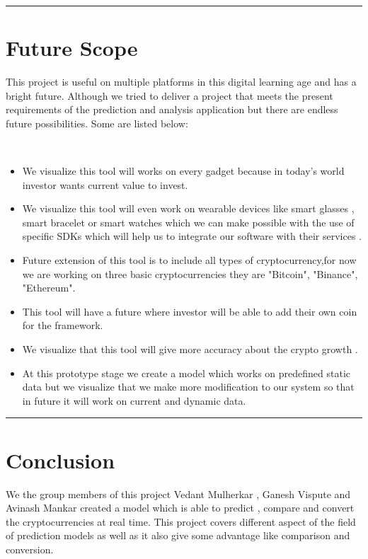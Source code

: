 \documentclass[openany,12pt]{report}
\begin{document}
{{{{{\vfill
\hrule
\chapter{Future Scope}
\hspace{0.5in}This project is useful on multiple platforms in this digital
learning age and has a bright future. Although we tried to deliver a project that meets the present requirements of the prediction and analysis application but there are endless future possibilities. Some are listed below:

\\
\begin{itemize}
\item{We visualize this tool will works on every gadget because in today's world investor wants current value to invest.}
\item{We visualize this tool will even work on wearable devices like smart glasses , smart bracelet or smart watches which we can make possible with the use of specific SDKs which will help us to integrate our software with their services .}
\item{Future extension of this tool is to include all types of cryptocurrency,for now we are working on three basic cryptocurrencies they are "Bitcoin", "Binance", "Ethereum".}
\item{This tool will have a future where investor will be able to add their own coin for the framework.}
\item{We visualize that this tool will give more accuracy about the crypto growth .}
\item{At this prototype stage we create a model which works on predefined static data but we visualize that we make more modification to our system so that in future it will work on current and dynamic data.}
\end{itemize}


\vfill
\hrule
\chapter{Conclusion}
 We the group members of this project Vedant Mulherkar , Ganesh Vispute and Avinash Mankar created a model which is able to predict , compare and convert the cryptocurrencies at real time.
 This project covers different aspect of the field of prediction models as well as it also give some advantage like comparison and conversion.
 
}}}}}
\end{document}
